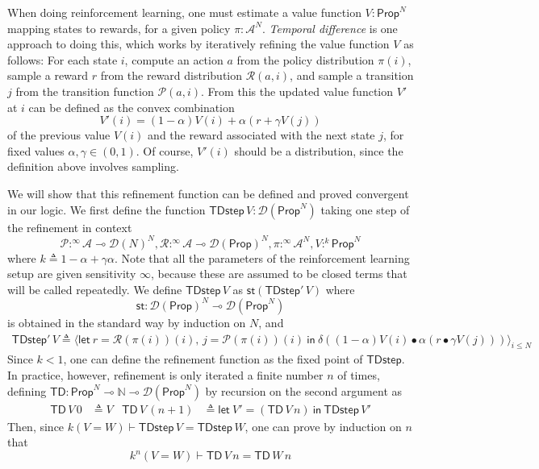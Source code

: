 \documentclass[a4paper,UKenglish,cleveref, autoref, thm-restate]{lipics-v2021}
\newcommand{\lol}{\mathbin{\multimap}}
\newcommand{\mexp}{\lol}
\newcommand{\nat}{\mathbb{N}}
\newcommand{\D}{\mathcal{D}}
\newcommand{\Act}{\mathcal A}
\newcommand{\trans}{\mathcal P}
\newcommand{\reward}{\mathcal R}
\newcommand{\policy}{\pi}
\newcommand{\refine}{\textsf{TDstep}}
\newcommand{\TDfunc}{\textsf{TD}}
\newcommand{\strength}{\textsf{st}}
\newcommand{\ts}{\vdash}
\newcommand{\letIn}[2]{\mathsf{let~} #1 \mathsf{~in~} #2}
\newcommand{\tuple}[1]{\langle #1 \rangle}
\newcommand{\Prop}{\mathsf{Prop}}
\newcommand{\ltensor}{*}
\renewcommand{\ltensor}{\bullet}
\newcommand{\TD}{\mathcal{D}}
\newcommand{\peq}{=}
\newcommand{\defeq}{\triangleq}
\begin{document}
When doing reinforcement learning, one must estimate a value function $V : \Prop^N$ mapping states to rewards, 
for a given policy $\policy : \Act^N$. \emph{Temporal difference}
is one approach to doing this, which works by iteratively refining the value function $V$ as follows:
For each state $i$, compute an action $a$ from the policy distribution $\policy(i)$, sample a reward
$r$ from the reward distribution  $\reward(a,i)$, and sample a transition $j$ from the transition function
$\trans(a,i)$. From this the updated value function $V'$ at $i$ can be defined as the convex combination
\[
 V'(i) = (1-\alpha)V(i) + \alpha(r + \gamma V(j))
\]
of the previous value $V(i)$ and the reward associated with the next state $j$, for fixed values $\alpha, \gamma \in (0,1)$. 
Of course, $V'(i)$ should be a distribution, since the definition above involves sampling. 

We will show that this refinement function can be defined and proved convergent in our logic. 
We first define the function ${\refine\, V}:{\TD(\Prop^N)}$ taking one step of the refinement 
 in context 
\[
 \trans :^\infty \Act \lol \D(N)^N, \reward :^\infty  \Act \lol \TD(\Prop)^N, \policy :^\infty \Act^N, V :^k \Prop^N
\]
where $k \defeq 1-\alpha + \gamma\alpha$. 
Note that all the parameters of the reinforcement learning setup are given sensitivity $\infty$, because these
are assumed to be closed terms that will be called repeatedly. 
We define $\refine\,V$ as $\strength (\refine'\,V)$ where
\[
  \strength : \TD(\Prop)^N \lol \TD(\Prop^N)
\]
is obtained in the standard way by induction on $N$, and
\begin{align*}
\refine'\,V \defeq \tuple{\letIn{r = \reward(\policy(i))(i) , \, %
  j = \trans(\policy(i))(i) }{
  \delta((1-\alpha)V(i) \ltensor \alpha(r \ltensor \gamma V(j)))
  }}_{i\leq N} 
\end{align*}
Since $k <1$, one can define the refinement function as the fixed point of $\refine$. 
In practice, however,
refinement is only iterated a finite number $n$ of times, defining $\TDfunc : \Prop^N \mexp \nat \mexp \TD(\Prop^N)$
by recursion on the second argument as 
\begin{align*}
 \TDfunc \, V \, 0 & \defeq V & 
 \TDfunc \, V\, (n+1) & \defeq \letIn{V' = (\TDfunc\, V \, n)}{\refine\, V'}
\end{align*}
Then, since $k(V \peq W) \ts \refine\, V \peq \refine \, W$, one can prove by induction on $n$ that 
\[
  k^n(V \peq W) \vdash \TDfunc\,V\, n \peq \TDfunc\, W\, n
\]
\end{document}
